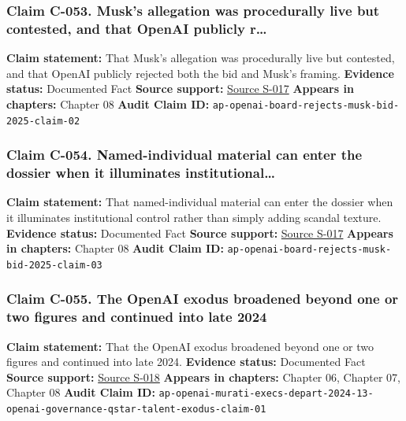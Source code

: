 \documentclass[
  american,
  11pt,
  letterpaper,
]{article}
\begin{document}
\subsubsection{Claim C-053. Musk's allegation was procedurally live but
contested, and that OpenAI publicly
r\ldots{}}\label{claim-c-053-musk-s-allegation-was-procedurally-live-but-contested-and-that-openai-publicly-r}

\textbf{Claim statement:} That Musk's allegation was procedurally live
but contested, and that OpenAI publicly rejected both the bid and Musk's
framing. \textbf{Evidence status:} Documented Fact \textbf{Source
support:}
\hyperref[source-s-017-openai-board-unanimously-rejects-elon-musk-s-97-4-billion-proposal]{Source
S-017} \textbf{Appears in chapters:} Chapter 08 \textbf{Audit Claim ID:}
\texttt{ap-openai-board-rejects-musk-bid-2025-claim-02}

\subsubsection{Claim C-054. Named-individual material can enter the
dossier when it illuminates
institutional\ldots{}}\label{claim-c-054-named-individual-material-can-enter-the-dossier-when-it-illuminates-institutional}

\textbf{Claim statement:} That named-individual material can enter the
dossier when it illuminates institutional control rather than simply
adding scandal texture. \textbf{Evidence status:} Documented Fact
\textbf{Source support:}
\hyperref[source-s-017-openai-board-unanimously-rejects-elon-musk-s-97-4-billion-proposal]{Source
S-017} \textbf{Appears in chapters:} Chapter 08 \textbf{Audit Claim ID:}
\texttt{ap-openai-board-rejects-musk-bid-2025-claim-03}

\subsubsection{Claim C-055. The OpenAI exodus broadened beyond one or
two figures and continued into late
2024}\label{claim-c-055-the-openai-exodus-broadened-beyond-one-or-two-figures-and-continued-into-late-2024}

\textbf{Claim statement:} That the OpenAI exodus broadened beyond one or
two figures and continued into late 2024. \textbf{Evidence status:}
Documented Fact \textbf{Source support:}
\hyperref[source-s-018-openai-chief-technology-officer-mira-murati-and-2-other-execs-are-leaving-the-chatgpt-maker]{Source
S-018} \textbf{Appears in chapters:} Chapter 06, Chapter 07, Chapter 08
\textbf{Audit Claim ID:}
\texttt{ap-openai-murati-execs-depart-2024-13-openai-governance-qstar-talent-exodus-claim-01}
\end{document}
